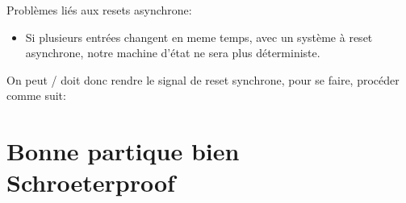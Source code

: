 Problèmes liés aux resets asynchrone:
\begin{itemize}
    \item Si plusieurs entrées changent en meme temps, avec un système à reset asynchrone, notre machine d'état ne sera plus déterministe.
\end{itemize}

On peut / doit donc rendre le signal de reset synchrone, pour se faire, procéder comme suit:


\section{Bonne partique bien Schroeterproof}












